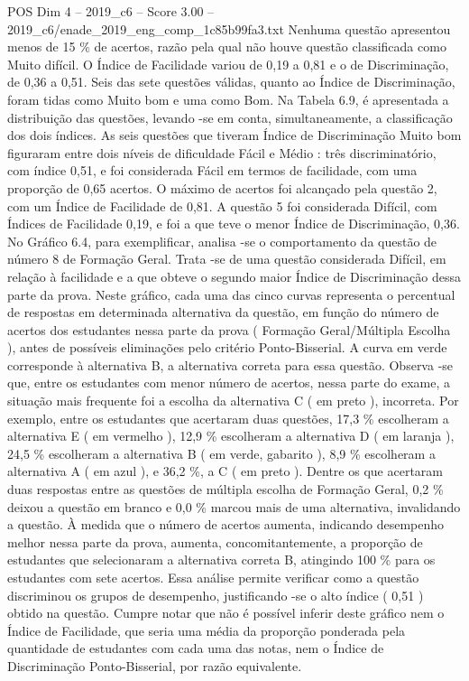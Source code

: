 \begin{textsample}{POS Dim 4 – 2019\_c6 – Score 3.00 – 2019\_c6/enade\_2019\_eng\_comp\_1c85b99fa3.txt}
Nenhuma questão apresentou menos de 15 \% de acertos, razão pela qual não houve questão classificada como Muito difícil.
O Índice de Facilidade variou de 0,19 a 0,81 e o de Discriminação, de 0,36 a 0,51.
Seis das sete questões válidas, quanto ao Índice de Discriminação, foram tidas como Muito bom e uma como Bom.
Na Tabela 6.9, é apresentada a distribuição das questões, levando -se em conta, simultaneamente, a classificação dos dois índices.
As seis questões que tiveram Índice de Discriminação Muito bom figuraram entre dois níveis de dificuldade Fácil e Médio : três discriminatório, com índice 0,51, e foi considerada Fácil em termos de facilidade, com uma proporção de 0,65 acertos.
O máximo de acertos foi alcançado pela questão 2, com um Índice de Facilidade de 0,81.
A questão 5 foi considerada Difícil, com Índices de Facilidade 0,19, e foi a que teve o menor Índice de Discriminação, 0,36.
No Gráfico 6.4, para exemplificar, analisa -se o comportamento da questão de número 8 de Formação Geral.
Trata -se de uma questão considerada Difícil, em relação à facilidade e a que obteve o segundo maior Índice de Discriminação dessa parte da prova.
Neste gráfico, cada uma das cinco curvas representa o percentual de respostas em determinada alternativa da questão, em função do número de acertos dos estudantes nessa parte da prova ( Formação Geral/Múltipla Escolha ), antes de possíveis eliminações pelo critério Ponto-Bisserial.
A curva em verde corresponde à alternativa B, a alternativa correta para essa questão.
Observa -se que, entre os estudantes com menor número de acertos, nessa parte do exame, a situação mais frequente foi a escolha da alternativa C ( em preto ), incorreta.
Por exemplo, entre os estudantes que acertaram duas questões, 17,3 \% escolheram a alternativa E ( em vermelho ), 12,9 \% escolheram a alternativa D ( em laranja ), 24,5 \% escolheram a alternativa B ( em verde, gabarito ), 8,9 \% escolheram a alternativa A ( em azul ), e 36,2 \%, a C ( em preto ).
Dentre os que acertaram duas respostas entre as questões de múltipla escolha de Formação Geral, 0,2 \% deixou a questão em branco e 0,0 \% marcou mais de uma alternativa, invalidando a questão.
À medida que o número de acertos aumenta, indicando desempenho melhor nessa parte da prova, aumenta, concomitantemente, a proporção de estudantes que selecionaram a alternativa correta B, atingindo 100 \% para os estudantes com sete acertos.
Essa análise permite verificar como a questão discriminou os grupos de desempenho, justificando -se o alto índice ( 0,51 ) obtido na questão.
Cumpre notar que não é possível inferir deste gráfico nem o Índice de Facilidade, que seria uma média da proporção ponderada pela quantidade de estudantes com cada uma das notas, nem o Índice de Discriminação Ponto-Bisserial, por razão equivalente.

\end{textsample}
